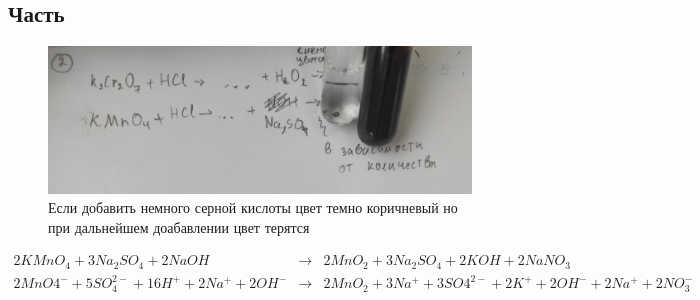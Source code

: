 \subsection{Часть}
\begin{figure}[h]
    \centering
    \includegraphics[width=1\linewidth]{Ex_3/Ex_3_2_2.jpg}
     \caption{Если добавить немного серной кислоты цвет темно коричневый но при дальнейшем доабавлении цвет терятся}
    \label{ex_3_2_2}
\end{figure}

\begin{eqnarray} 
    2KMnO_4 + 3Na_2SO_4 + 2NaOH &\xrightarrow{}& 
    2MnO_2 + 3Na_2SO_4 + 2KOH + 2NaNO_3\\
    2MnO4^- + 5SO_4^{2-} + 16H^+ + 2Na^+ + 2OH^- &\xrightarrow{}& 
    2MnO_2 + 3Na^+ + 3SO4^{2-} + 2K^+ + 2OH^- + 2Na^+ + 2NO_3^-
\end{eqnarray} 
